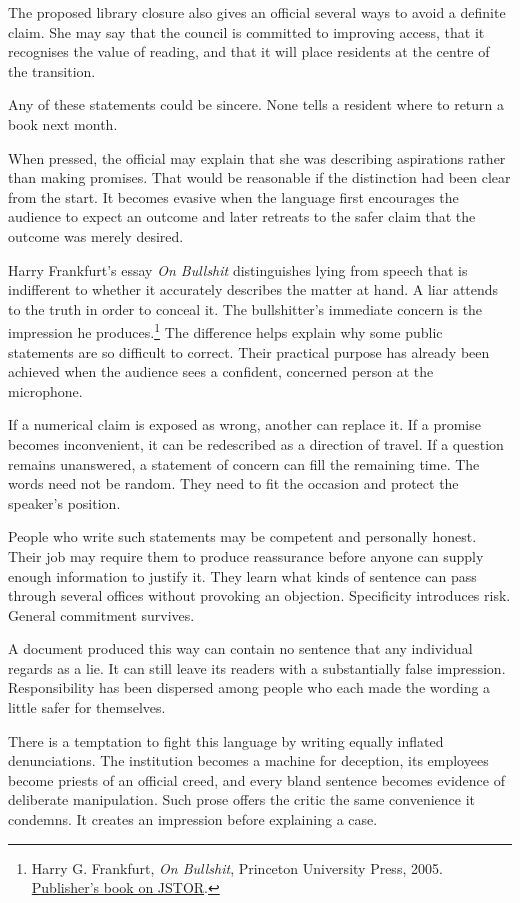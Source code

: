 \documentclass[12pt,a4paper]{book}
\begin{document}
The proposed library closure also gives an official several ways to avoid a definite claim. She may say that the council is committed to improving access, that it recognises the value of reading, and that it will place residents at the centre of the transition.

Any of these statements could be sincere. None tells a resident where to return a book next month.

When pressed, the official may explain that she was describing aspirations rather than making promises. That would be reasonable if the distinction had been clear from the start. It becomes evasive when the language first encourages the audience to expect an outcome and later retreats to the safer claim that the outcome was merely desired.

Harry Frankfurt's essay \emph{On Bullshit} distinguishes lying from speech that is indifferent to whether it accurately describes the matter at hand. A liar attends to the truth in order to conceal it. The bullshitter's immediate concern is the impression he produces.\footnote{Harry G. Frankfurt, \emph{On Bullshit}, Princeton University Press, 2005. \href{https://www.jstor.org/stable/j.ctt7t4wr}{Publisher's book on JSTOR}.} The difference helps explain why some public statements are so difficult to correct. Their practical purpose has already been achieved when the audience sees a confident, concerned person at the microphone.

If a numerical claim is exposed as wrong, another can replace it. If a promise becomes inconvenient, it can be redescribed as a direction of travel. If a question remains unanswered, a statement of concern can fill the remaining time. The words need not be random. They need to fit the occasion and protect the speaker's position.

People who write such statements may be competent and personally honest. Their job may require them to produce reassurance before anyone can supply enough information to justify it. They learn what kinds of sentence can pass through several offices without provoking an objection. Specificity introduces risk. General commitment survives.

A document produced this way can contain no sentence that any individual regards as a lie. It can still leave its readers with a substantially false impression. Responsibility has been dispersed among people who each made the wording a little safer for themselves.

There is a temptation to fight this language by writing equally inflated denunciations. The institution becomes a machine for deception, its employees become priests of an official creed, and every bland sentence becomes evidence of deliberate manipulation. Such prose offers the critic the same convenience it condemns. It creates an impression before explaining a case.
\end{document}
